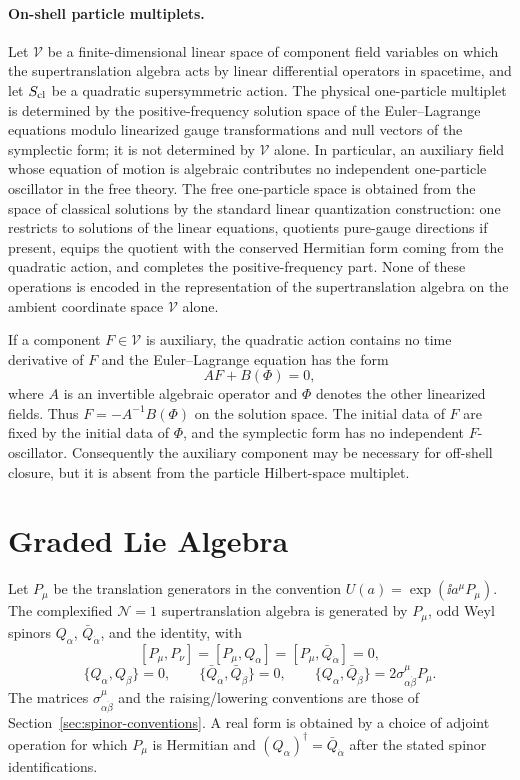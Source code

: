 \paragraph{On-shell particle multiplets.}
Let \(\mathcal V\) be a finite-dimensional linear space of component field
variables on which the supertranslation algebra acts by linear differential
operators in spacetime, and let \(S_{\rm cl}\) be a quadratic supersymmetric
action.  The physical one-particle multiplet is determined by the
positive-frequency solution space of the Euler--Lagrange equations modulo
linearized gauge transformations and null vectors of the symplectic form; it
is not determined by \(\mathcal V\) alone.  In particular, an auxiliary field
whose equation of motion is algebraic contributes no independent one-particle
oscillator in the free theory.
The free one-particle space is obtained from the space of classical solutions
by the standard linear quantization construction: one restricts to solutions
of the linear equations, quotients pure-gauge directions if present, equips
the quotient with the conserved Hermitian form coming from the quadratic
action, and completes the positive-frequency part.  None of these operations
is encoded in the representation of the supertranslation algebra on the
ambient coordinate space \(\mathcal V\) alone.

If a component \(F\in\mathcal V\) is auxiliary, the quadratic action contains
no time derivative of \(F\) and the Euler--Lagrange equation has the form
\[
  A F+B(\Phi)=0,
\]
where \(A\) is an invertible algebraic operator and \(\Phi\) denotes the other
linearized fields.  Thus \(F=-A^{-1}B(\Phi)\) on the solution space.  The
initial data of \(F\) are fixed by the initial data of \(\Phi\), and the
symplectic form has no independent \(F\)-oscillator.  Consequently the
auxiliary component may be necessary for off-shell closure, but it is absent
from the particle Hilbert-space multiplet.

\section{Graded Lie Algebra}

\begin{definition}[Four-dimensional \(\mathcal N=1\) supertranslation algebra]
\label{def:n1-supertranslation-algebra}
Let \(P_\mu\) be the translation generators in the convention
\(U(a)=\exp(\ii a^\mu P_\mu)\).  The complexified \(\mathcal N=1\)
supertranslation algebra is generated by \(P_\mu\), odd Weyl spinors
\(Q_\alpha\), \(\bar Q_{\dot\alpha}\), and the identity, with
\[
  [P_\mu,P_\nu]=[P_\mu,Q_\alpha]=[P_\mu,\bar Q_{\dot\alpha}]=0,
\]
\[
  \{Q_\alpha,Q_\beta\}=0,
  \qquad
  \{\bar Q_{\dot\alpha},\bar Q_{\dot\beta}\}=0,
  \qquad
  \{Q_\alpha,\bar Q_{\dot\beta}\}
  =
  2\sigma^\mu_{\alpha\dot\beta}P_\mu .
\]
The matrices \(\sigma^\mu_{\alpha\dot\beta}\) and the raising/lowering
conventions are those of Section~\ref{sec:spinor-conventions}.  A real form is obtained by a
choice of adjoint operation for which \(P_\mu\) is Hermitian and
\((Q_\alpha)^\dagger=\bar Q_{\dot\alpha}\) after the stated spinor
identifications.
\end{definition}

